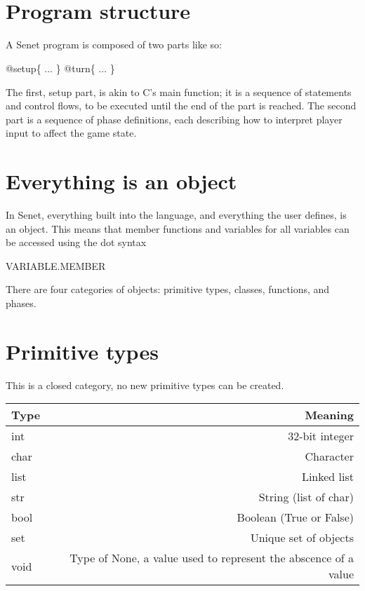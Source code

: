\documentclass{article}
\title{
    \vspace{2in}
    \textmd{\textbf{\hmwkTitle}}\\
    \vspace{3in}
}
\date{}
\begin{document}
\maketitle

\pagebreak
\section{Program structure}
A Senet program is composed of two parts like so:

\begin{algorithmic}
\STATE @setup\{
\STATE ...
\STATE \}
\STATE @turn\{
\STATE ...
\STATE \}
\end{algorithmic}

The first, setup part, is akin to C's main function; it is a sequence of
statements and control flows, to be executed until the end of the part is
reached. The second part is a sequence of phase definitions, each describing
how to interpret player input to affect the game state.

\section{Everything is an object}
In Senet, everything built into the language, and everything the user defines,
is an object. This means that member functions and variables for all variables
can be accessed using the dot syntax
\begin{algorithmic}
\State VARIABLE.MEMBER
\end{algorithmic}
There are four categories of objects: primitive types, classes,
functions, and phases.

\section{Primitive types}
This is a closed category, no new primitive types can be created.

\begin{tabular} {l | r}
\textbf{Type} & \textbf{Meaning}\\ \toprule
int & $32$-bit integer \\ \toprule
char & Character \\ \toprule
list & Linked list \\ \toprule %
str & String (list of char) \\ \toprule
bool & Boolean (True or False) \\ \toprule
set & Unique set of objects \\ \toprule
void & Type of None, a value used to represent the abscence of a value \\ \toprule

\end{tabular}
\end{document}

